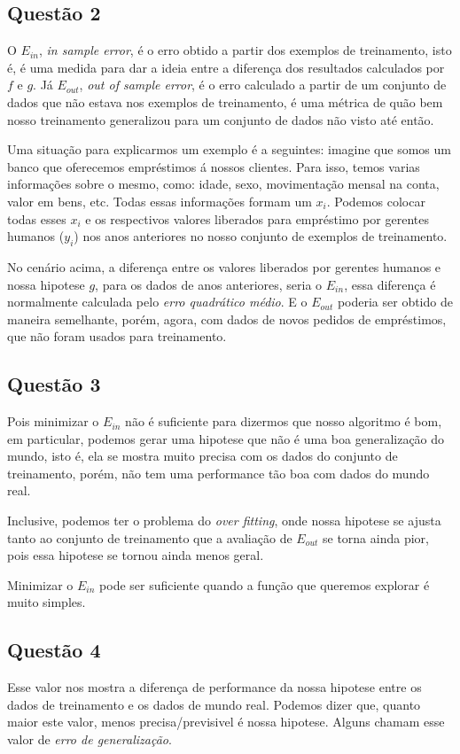 \documentclass[12pt, a4paper]{article}
\begin{document}
\subsection*{Questão 2}{
    O $ E_{in} $, \emph{in sample error}, é o erro obtido a partir dos exemplos de treinamento, isto é, é uma medida para dar a ideia entre a diferença dos resultados calculados por $ f $ e $ g $. Já $ E_{out} $, \emph{out of sample error}, é o erro calculado a partir de um conjunto de dados que não estava nos exemplos de treinamento, é uma métrica de quão bem nosso treinamento generalizou para um conjunto de dados não visto até então.

    Uma situação para explicarmos um exemplo é a seguintes: imagine que somos um banco que oferecemos empréstimos á nossos clientes. Para isso, temos varias informações sobre o mesmo, como: idade, sexo, movimentação mensal na conta, valor em bens, etc. Todas essas informações formam um $ x_i $. Podemos colocar todas esses $ x_i $ e os respectivos valores liberados para empréstimo por gerentes humanos ($y_i$) nos anos anteriores no nosso conjunto de exemplos de treinamento.

    No cenário acima, a diferença entre os valores liberados por gerentes humanos e nossa hipotese $ g $, para os dados de anos anteriores, seria o $ E_{in} $, essa diferença é normalmente calculada pelo \emph{erro quadrático médio}. E o $ E_{out} $ poderia ser obtido de maneira semelhante, porém, agora, com dados de novos pedidos de empréstimos, que não foram usados para treinamento.
}

\subsection*{Questão 3}{
    Pois minimizar o $ E_{in} $ não é suficiente para dizermos que nosso algoritmo é bom, em particular, podemos gerar uma hipotese que não é uma boa generalização do mundo, isto é, ela se mostra muito precisa com os dados do conjunto de treinamento, porém, não tem uma performance tão boa com dados do mundo real.

    Inclusive, podemos ter o problema do \emph{over fitting}, onde nossa hipotese se ajusta tanto ao conjunto de treinamento que a avaliação de $ E_{out} $ se torna ainda pior, pois essa hipotese se tornou ainda menos geral.

    Minimizar o $ E_{in} $ pode ser suficiente quando a função que queremos explorar é muito simples.
}

\subsection*{Questão 4}{
    Esse valor nos mostra a diferença de performance da nossa hipotese entre os dados de treinamento e os dados de mundo real. Podemos dizer que, quanto maior este valor, menos precisa/previsivel é nossa hipotese. Alguns chamam esse valor de \emph{erro de generalização}.
}
\end{document}
